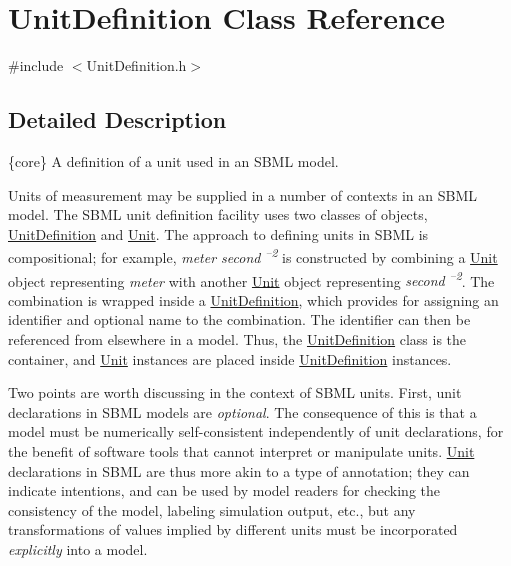 \hypertarget{class_unit_definition}{}\section{Unit\+Definition Class Reference}
\label{class_unit_definition}


{\ttfamily \#include $<$Unit\+Definition.\+h$>$}



\subsection{Detailed Description}
\{core\} A definition of a unit used in an S\+B\+ML model.

Units of measurement may be supplied in a number of contexts in an S\+B\+ML model. The S\+B\+ML unit definition facility uses two classes of objects, \hyperlink{class_unit_definition}{Unit\+Definition} and \hyperlink{class_unit}{Unit}. The approach to defining units in S\+B\+ML is compositional; for example, {\itshape meter second\textsuperscript{ --2}} is constructed by combining a \hyperlink{class_unit}{Unit} object representing {\itshape meter} with another \hyperlink{class_unit}{Unit} object representing {\itshape second\textsuperscript{ --2}}. The combination is wrapped inside a \hyperlink{class_unit_definition}{Unit\+Definition}, which provides for assigning an identifier and optional name to the combination. The identifier can then be referenced from elsewhere in a model. Thus, the \hyperlink{class_unit_definition}{Unit\+Definition} class is the container, and \hyperlink{class_unit}{Unit} instances are placed inside \hyperlink{class_unit_definition}{Unit\+Definition} instances.

Two points are worth discussing in the context of S\+B\+ML units. First, unit declarations in S\+B\+ML models are {\itshape optional}. The consequence of this is that a model must be numerically self-\/consistent independently of unit declarations, for the benefit of software tools that cannot interpret or manipulate units. \hyperlink{class_unit}{Unit} declarations in S\+B\+ML are thus more akin to a type of annotation; they can indicate intentions, and can be used by model readers for checking the consistency of the model, labeling simulation output, etc., but any transformations of values implied by different units must be incorporated {\itshape explicitly} into a model.

